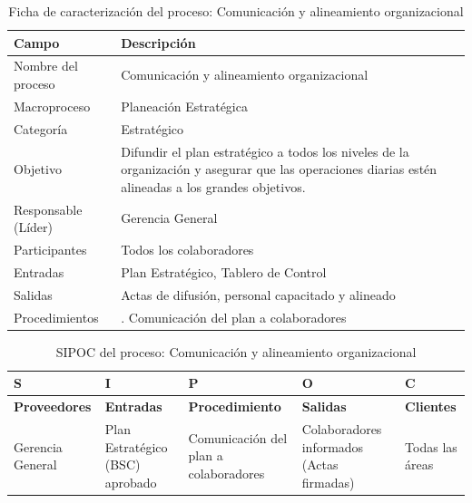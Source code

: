 \documentclass[11pt, a4paper, oneside]{report}
\begin{document}
\begin{table}[H]
\centering\small
\renewcommand{\arraystretch}{1.35}
\setlength{\tabcolsep}{6pt}
\begin{tabularx}{\textwidth}{|>{\raggedright\arraybackslash}p{}|>{\raggedright\arraybackslash}X|}
\hline
\rowcolor{upeu_dark}
\color{white}\bfseries Campo & \color{white}\bfseries Descripción \\ \hline
\rowcolor{gray!10}
Nombre del proceso & Comunicación y alineamiento organizacional \\ \hline
Macroproceso & Planeación Estratégica \\ \hline
\rowcolor{gray!10}
Categoría & Estratégico \\ \hline
Objetivo & Difundir el plan estratégico a todos los niveles de la organización y asegurar que las operaciones diarias estén alineadas a los grandes objetivos. \\ \hline
\rowcolor{gray!10}
Responsable (Líder) & Gerencia General \\ \hline
Participantes & Todos los colaboradores \\ \hline
\rowcolor{gray!10}
Entradas & Plan Estratégico, Tablero de Control \\ \hline
Salidas & Actas de difusión, personal capacitado y alineado \\ \hline
\rowcolor{gray!10}
Procedimientos & 1. Comunicación del plan a colaboradores \\ \hline
\end{tabularx}
\caption{Ficha de caracterización del proceso: Comunicación y alineamiento organizacional}
\end{table}

\begin{table}[H]
\centering\small
\renewcommand{\arraystretch}{1.3}
\setlength{\tabcolsep}{4pt}
\begin{tabularx}{\textwidth}{|>{\raggedright\arraybackslash}p{}|>{\raggedright\arraybackslash}p{}|>{\raggedright\arraybackslash}p{}|>{\raggedright\arraybackslash}p{}|>{\raggedright\arraybackslash}X|}
\hline
\rowcolor{upeu_dark}
\color{white}\bfseries S & \color{white}\bfseries I & \color{white}\bfseries P & \color{white}\bfseries O & \color{white}\bfseries C \\ \hline
\rowcolor{upeu_light}
\bfseries Proveedores & \bfseries Entradas & \bfseries Procedimiento & \bfseries Salidas & \bfseries Clientes \\ \hline
Gerencia General &
Plan Estratégico (BSC) aprobado &
Comunicación del plan a colaboradores &
Colaboradores informados (Actas firmadas) &
Todas las áreas \\ \hline
\end{tabularx}
\caption{SIPOC del proceso: Comunicación y alineamiento organizacional}
\end{table}
\end{document}
